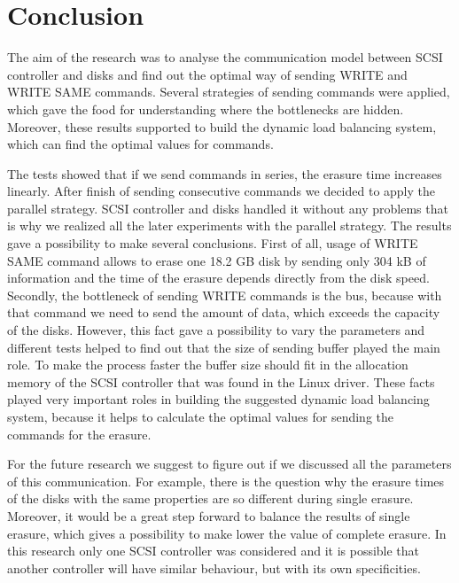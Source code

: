 \chapter{Conclusion}
\label{chap6:title}

The aim of the research was to analyse the communication model between SCSI controller and disks and find out the optimal way of sending WRITE and WRITE SAME commands. Several strategies of sending commands were applied, which gave the food for understanding where the bottlenecks are hidden. Moreover, these results supported to build the dynamic load balancing system, which can find the optimal values for commands.

The tests showed that if we send commands in series, the erasure time increases linearly. After finish of sending consecutive commands we decided to apply the parallel strategy. SCSI controller and disks handled it without any problems that is why we realized all the later experiments with the parallel strategy. The results gave a possibility to make several conclusions. First of all, usage of WRITE SAME command allows to erase one 18.2 GB disk by sending only 304 kB of information and the time of the erasure depends directly from the disk speed. Secondly, the bottleneck of sending WRITE commands is the bus, because with that command we need to send the amount of data, which exceeds the capacity of the disks. However, this fact gave a possibility to vary the parameters and different tests helped to find out that the size of sending buffer played the main role. To make the process faster the buffer size should fit in the allocation memory of the SCSI controller that was found in the Linux driver. These facts played very important roles in building the suggested dynamic load balancing system, because it helps to calculate the optimal values for sending the commands for the erasure.

For the future research we suggest to figure out if we discussed all the parameters of this communication. For example, there is the question why the erasure times of the disks with the same properties are so different during single erasure. Moreover, it would be a great step forward to balance the results of single erasure, which gives a possibility to make lower the value of complete erasure. In this research only one SCSI controller was considered and it is possible that another controller will have similar behaviour, but with its own specificities.